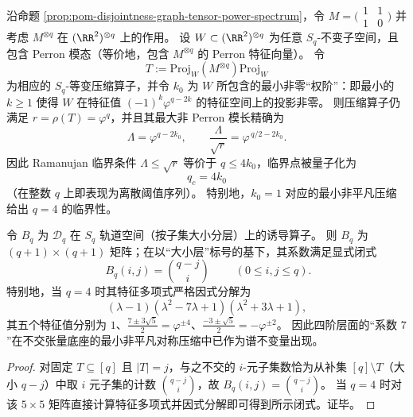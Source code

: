 \begin{conclusion}\label{con:pom-disjointness-sq-equivariant-critical-quantization}
沿命题 \ref{prop:pom-disjointness-graph-tensor-power-spectrum}，令
\(
M=\bigl(\begin{smallmatrix}1&1\\[2pt]1&0\end{smallmatrix}\bigr)
\)
并考虑 \(M^{\otimes q}\) 在 \((\RR^2)^{\otimes q}\) 上的作用。
设 \(W\subset(\RR^2)^{\otimes q}\) 为任意 \(S_q\)-不变子空间，且包含 Perron 模态（等价地，包含 \(M^{\otimes q}\) 的 Perron 特征向量）。
令
\[
T:=\mathrm{Proj}_W(M^{\otimes q})\mathrm{Proj}_W
\]
为相应的 \(S_q\)-等变压缩算子，并令 \(k_0\) 为 \(W\) 所包含的最小非零“权阶”：即最小的 \(k\ge 1\) 使得 \(W\) 在特征值 \((-1)^k\varphi^{q-2k}\) 的特征空间上的投影非零。
则压缩算子仍满足 \(r=\rho(T)=\varphi^q\)，并且其最大非 Perron 模长精确为
\[
\Lambda=\varphi^{q-2k_0},
\qquad
\frac{\Lambda}{\sqrt r}=\varphi^{\,q/2-2k_0}.
\]
因此 Ramanujan 临界条件 \(\Lambda\le \sqrt r\) 等价于 \(q\le 4k_0\)，临界点被量子化为
\[
\boxed{\;q_c=4k_0\;}
\]
（在整数 \(q\) 上即表现为离散阈值序列）。
特别地，\(k_0=1\) 对应的最小非平凡压缩给出 \(q=4\) 的临界性。
\end{conclusion}

\begin{proposition}\label{prop:pom-disjointness-symmetric-compression-bq}
令 \(B_q\) 为 \(\mathcal{D}_q\) 在 \(S_q\) 轨道空间（按子集大小分层）上的诱导算子。
则 \(B_q\) 为 \((q+1)\times(q+1)\) 矩阵；在以“大小层”标号的基下，其系数满足显式闭式
\[
\boxed{\;B_q(i,j)=\binom{q-j}{i}\;}\qquad(0\le i,j\le q).
\]
特别地，当 \(q=4\) 时其特征多项式严格因式分解为
\[
(\lambda-1)(\lambda^2-7\lambda+1)(\lambda^2+3\lambda+1),
\]
其五个特征值分别为
\(
1
\)、\(
\frac{7\pm 3\sqrt5}{2}=\varphi^{\pm 4}
\)、\(
\frac{-3\pm\sqrt5}{2}=-\varphi^{\pm 2}
\)。
因此四阶层面的“系数 \(7\)”在不交张量底座的最小非平凡对称压缩中已作为谱不变量出现。
\end{proposition}
\begin{proof}
对固定 \(T\subseteq[q]\) 且 \(|T|=j\)，与之不交的 \(i\)-元子集数恰为从补集 \([q]\setminus T\)（大小 \(q-j\)）中取 \(i\) 元子集的计数 \(\binom{q-j}{i}\)，故 \(B_q(i,j)=\binom{q-j}{i}\)。
当 \(q=4\) 时对该 \(5\times 5\) 矩阵直接计算特征多项式并因式分解即可得到所示闭式。证毕。
\end{proof}

